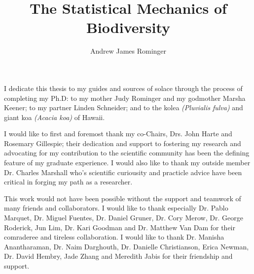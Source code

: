 \documentclass{ucbthesis}
\begin{document}

\title{The Statistical Mechanics of Biodiversity}
\author{Andrew James Rominger}

\maketitle
\approvalpage
\copyrightpage



\begin{frontmatter}

\begin{dedication}
\null\vfil
\begin{center}
  I dedicate this thesis to my guides and sources of solace through
  the process of completing my Ph.D: to my mother Judy Rominger and my
  godmother Marsha Keener; to my partner Linden Schneider; and to the
  kolea \textit{(Pluvialis fulva)} and giant koa \textit{(Acacia koa)}
  of Hawaii.
\end{center}
\vfil\null
\end{dedication}


\tableofcontents
\clearpage
\listoffigures
\clearpage
\listoftables

\begin{acknowledgements}
I would like to first and foremost thank my co-Chairs, Drs. John Harte
and Rosemary Gillespie; their dedication and support to fostering my
research and advocating for my contribution to the scientific
community has been the defining feature of my graduate experience.  I
would also like to thank my outside member Dr. Charles Marshall who's
scientific curiousity and practicle advice have been critical in
forging my path as a researcher.

This work would not have been possible without the support and
teamwork of many friends and collaborators.  I would like to thank
especially Dr. Pablo Marquet, Dr. Miguel Fuentes, Dr. Daniel Gruner,
Dr. Cory Merow, Dr. George Roderick, Jun Lim, Dr. Kari Goodman and Dr.
Matthew Van Dam for their comraderee and tireless collaboration.  I
would like to thank Dr. Manisha Anantharaman, Dr. Naim Darghouth,
Dr. Danielle Christianson, Erica Newman, Dr. David Hembry, Jade Zhang
and Meredith Jabis for their friendship and support.


\end{acknowledgements}
\end{frontmatter}
\end{document}
